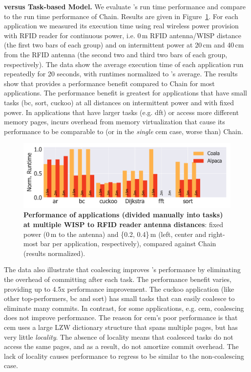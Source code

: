 \textbf{\sys versus Task-based Model.} We evaluate \sys's run time performance and compare \sys to the run time performance of Chain. Results are given in Figure~\ref{fig:runtime}. For each application we measured its execution time using real wireless power provision with RFID reader for continuous power, i.e. 0\,m RFID antenna/WISP distance (the first two bars of each group) and on intermittent power at 20\,cm and 40\,cm from the RFID antenna (the second two and third two bars of each group, respectively). The data show the average execution time of each application run repeatedly for 20 seconds, with runtimes normalized to \sys's average. The results show that \sys provides a performance benefit compared to Chain for most applications. The performance benefit is greatest for applications that have small tasks (bc, sort, cuckoo) at all distances on intermittent power and with fixed power. In applications that have larger tasks (e.g. dft) or access more different memory pages, \sys incurs overhead from memory virtualization that cause its performance to be comparable to (or in the \emph{single} cem case, worse than) Chain. 

\begin{figure}
	\centering
	\includegraphics[width=\columnwidth]{figures/coala_alpaca_gcc}
	\caption{\textbf{Performance of \sys applications (divided manually into tasks) at multiple WISP to RFID reader antenna distances}: fixed power (0\,m to the antenna) and \{0.2, 0.4\}\,m (left, center and right-most bar per application, respectively), compared against Chain (results normalized).}
	\label{fig:runtime}
\end{figure}

The data also illustrate that coalescing improves \sys's performance by eliminating the overhead of committing after each task. The performance benefit varies, providing up to 4.5x performance improvement. The cuckoo application (like other top-performers, bc and sort) has small tasks that \sys can easily coalesce to eliminate many commits. In contrast, for some applications, e.g. cem, coalescing does not improve performance. The reason for cem's poor performance is that cem uses a large LZW dictionary structure that spans multiple pages, but has very little {\em locality}. The absence of locality means that coalesced tasks do not access the same pages, and as a result, do not amortize commit overhead. The lack of locality causes performance to regress to be similar to the non-coalescing case. 


